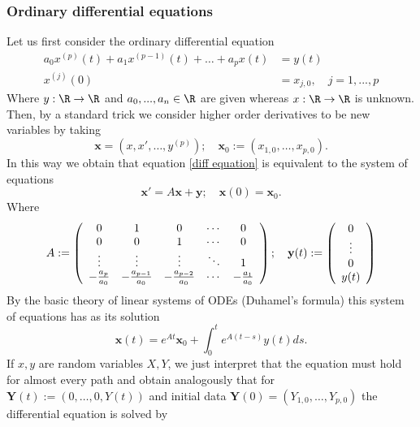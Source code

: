 \documentclass[12pt]{article}
\begin{document}
\subsubsection{Ordinary differential equations}
Let us first consider the ordinary differential equation
\begin{align}\label{diff equation}
    a_0x^{(p)}(t)+a_1x^{(p-1)}(t)+\ldots+a_px(t) & =y(t) \\ x^{(j)}(0)&=x_{j,0},\quad j=1,...,p
\end{align}
Where $y:\R\to\R$ and $a_0,...,a_n\in\R$ are given whereas  $x:\R\to\R$ is unknown. Then, by a standard trick we consider higher order derivatives to be new variables by taking $$\mathbf{x}=(x,x',\ldots,y^{(p)});\quad \textbf{x}_0:=(x_{1,0},\ldots,x_{p,0}).$$  In this way we obtain that  equation \eqref{diff equation} is equivalent to the system of equations
\begin{equation*}
    \mathbf{x}'=A\mathbf{x}+\mathbf{y};\quad \mathbf{x}(0)=\textbf{x}_0.
\end{equation*}
Where
\begin{equation}\label{A def}
    A:=\left(\begin{array}{ccccc}
            0                  & 1                    & 0                    & \cdots & 0                  \\
            0                  & 0                    & 1                    & \cdots & 0                  \\
            \vdots             & \vdots               & \vdots               & \ddots & 1                  \\
            -\frac{a_{p}}{a_0} & -\frac{a_{p-1}}{a_0} & -\frac{a_{p-2}}{a_0} & \cdots & -\frac{a_{1}}{a_0}
        \end{array}\right);\quad \mathbf{y}(t):= \qty(\begin{array}{c}
            0      \\
            \vdots \\
            0      \\
            y(t)
        \end{array})
\end{equation}
By the basic theory of linear systems of ODEs (Duhamel's formula) this system of equations has as its solution
\begin{equation*}
    \textbf{x}(t)=e^{A t}\textbf{x}_0+\int_{0}^t e^{A(t-s)}y(t)ds.
\end{equation*}
If $x,y$ are random variables  $X,Y$, we just interpret that the equation must hold for almost every path and obtain analogously that for $\mathbf{Y}(t):=(0,\ldots,0,Y(t))$ and initial data $\mathbf{Y}(0)=(Y_{1,0},\ldots,Y_{p,0})$ the differential equation is solved by
\end{document}
